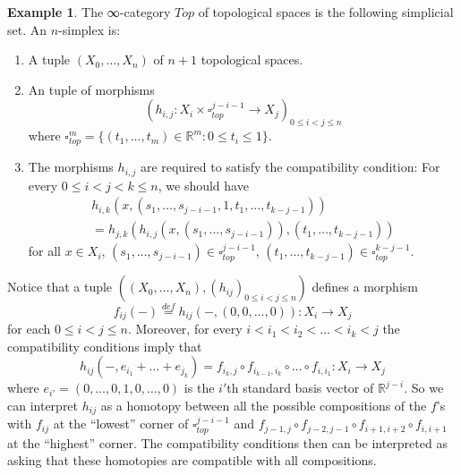 \documentclass[a4paper]{amsart}
\numberwithin{figure}{section}
\theoremstyle{theorem}
\theoremstyle{definition}
\newtheorem{exam}[thm]{Example}
\newcommand{\RR}{\mathbb{R}}
\DeclareMathOperator{\id}{id}
\begin{document}
\begin{exam} \label{exam:top}
The ∞-category $Top$ of topological spaces is the following simplicial set. An $n$-simplex is:
\begin{enumerate}
 \item A tuple $(X_0, \dots, X_n)$ of $n{+}1$ topological spaces.

 \item An tuple of morphisms  
 \[ (h_{i,j}: X_i {\times} \square^{j{-}i{-}1}_{top} \to X_{j})_{0 \leq i < j \leq n} \]%
 where $\square^m_{top} = \{ (t_1, \dots, t_m) \in \RR^m : 0 \leq t_i \leq 1 \}$.

 \item The morphisms $h_{i,j}$ are required to satisfy the compatibility condition: For every $0 \leq i < j < k \leq n$, we should have 
\begin{align*}
h_{i,k}(x, (s_1, \dots, s_{j{-}i{-}1}, 1, t_1, \dots, t_{k{-}j{-}1})) \\
= h_{j,k}(h_{i,j}(x, (s_1, \dots, s_{j{-}i{-}1})), (t_1, \dots, t_{k{-}j{-}1})) 
\end{align*}
for all $x \in X_i$, $(s_1, \dots, s_{j{-}i{-}1}) \in \square_{top}^{j{-}i{-}1}$, $(t_1, \dots, t_{k{-}j{-}1}) \in \square_{top}^{k{-}j{-}1}$.
\end{enumerate}

Notice that a tuple $((X_0, \dots, X_n), (h_{ij})_{0 \leq i < j \leq n})$ defines a morphism $$f_{ij}(-) \stackrel{def}{=} h_{ij}(-, (0,0,\dots, 0)) : X_i \to X_j$$ for each $0 \leq i < j \leq n$. Moreover, for every $i < i_1 < i_2 < \dots  < i_k < j$ the compatibility conditions imply that $$h_{ij}(-, e_{i_1} + \dots + e_{j_k}) = f_{i_k,j} \circ f_{i_{k-1},i_k} \circ \dots \circ f_{i, i_1}: X_i \to X_j$$ where $e_{i'} = (0, \dots, 0, 1, 0, \dots, 0)$ is the $i'$th standard basis vector of $\RR^{j{-}i}$. So we can interpret $h_{ij}$ as a homotopy between all the possible compositions of the $f$'s with $f_{ij}$ at the ``lowest'' corner of $\square^{j{-}i{-}1}_{top}$ and $f_{j{-}1,j} \circ f_{j{-}2,j{-}1} \circ f_{i{+}1,i{+}2} \circ f_{i,i{+}1}$ at the ``highest'' corner. The compatibility conditions then can be interpreted as asking that these homotopies are compatible with all compositions.


\end{exam}
\end{document}
